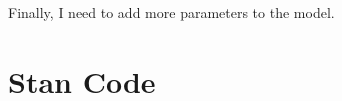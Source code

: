 \documentclass[12pt]{article}
\begin{document}
Finally, I need to add more parameters to the model.




\clearpage


\clearpage
\appendix
\section{Stan Code} \label{sec:stan}

\end{document}
